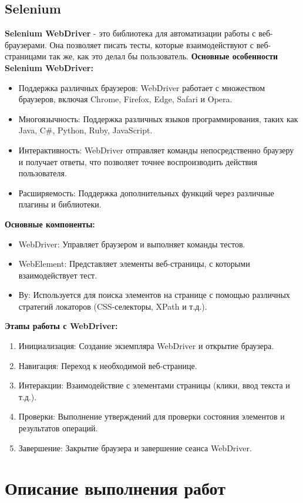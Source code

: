 \documentclass[areasetadvanced]{scrartcl}
\begin{document}
\subsection{Selenium}
\textbf{Selenium WebDriver} - это библиотека для автоматизации работы с веб-браузерами. Она позволяет писать тесты, которые взаимодействуют с веб-страницами так же, как это делал бы пользователь.
\textbf{Основные особенности Selenium WebDriver:}
\begin{itemize}
	\item Поддержка различных браузеров: WebDriver работает с множеством браузеров, включая Chrome, Firefox, Edge, Safari и Opera.
	\item Многоязычность: Поддержка различных языков программирования, таких как Java, C\#, Python, Ruby, JavaScript.
	\item Интерактивность: WebDriver отправляет команды непосредственно браузеру и получает ответы, что позволяет точнее воспроизводить действия пользователя.
	\item Расширяемость: Поддержка дополнительных функций через различные плагины и библиотеки.
\end{itemize}
\textbf{Основные компоненты:}
\begin{itemize}
	\item WebDriver: Управляет браузером и выполняет команды тестов.
	\item WebElement: Представляет элементы веб-страницы, с которыми взаимодействует тест.
	\item Ву: Используется для поиска элементов на странице с помощью различных стратегий локаторов (CSS-селекторы, XPath и т.д.).
\end{itemize}
\textbf{Этапы работы с WebDriver:}
\begin{enumerate}
	\item Инициализация: Создание экземпляра WebDriver и открытие браузера.
	\item Навигация: Переход к необходимой веб-странице.
	\item Интеракции: Взаимодействие с элементами страницы (клики, ввод текста и т.д.).
	\item Проверки: Выполнение утверждений для проверки состояния элементов и результатов операций.
	\item Завершение: Закрытие браузера и завершение сеанса WebDriver.
\end{enumerate}
\newpage
\section{Описание выполнения работ}
\end{document}
